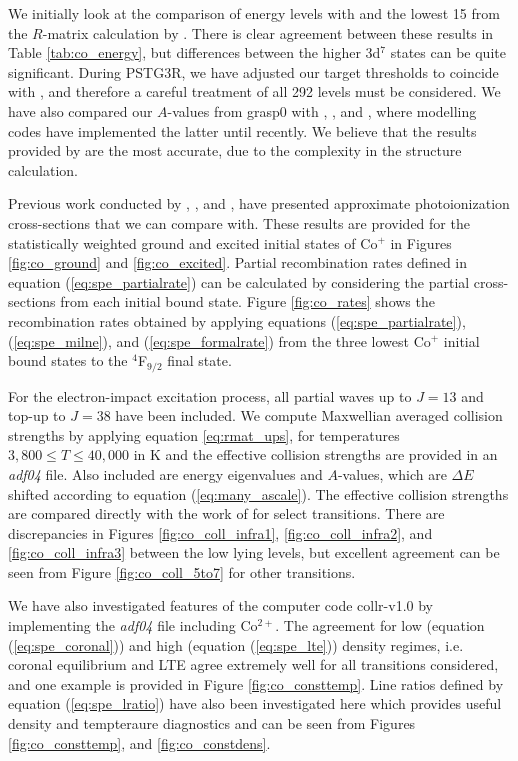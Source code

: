 We initially look at the comparison of energy levels with \citet{1985aeli.book.....S} and the lowest 15 from the $R$-matrix calculation by \citet{2016MNRAS.tmp..556S}. There is clear agreement between these results in Table \ref{tab:co_energy}, but differences between the higher 3d$^7$ states can be quite significant. During PSTG3R, we have adjusted our target thresholds to coincide with \citet{1985aeli.book.....S}, and therefore a careful treatment of all 292 levels must be considered. We have also compared our $A$-values from {\sc grasp0} with \citet{2016MNRAS.tmp..556S}, \citet{2016A&A...585A.121F}, and \citet{1984ApJ...277..435H}, where modelling codes have implemented the latter until recently. We believe that the results provided by \citet{2016A&A...585A.121F} are the most accurate, due to the complexity in the structure calculation.

Previous work conducted by \citet{1979ApJS...40..815R}, \citet{1993ADNDT..55..233V}, and \citet{2015JPhB...48n4014F}, have presented approximate photoionization cross-sections that we can compare with. These results are provided for the statistically weighted ground and excited initial states of Co$^+$ in Figures \ref{fig:co_ground} and \ref{fig:co_excited}. Partial recombination rates defined in equation (\ref{eq:spe_partialrate}) can be calculated by considering the partial cross-sections from each initial bound state. Figure \ref{fig:co_rates} shows the recombination rates obtained by applying equations (\ref{eq:spe_partialrate}), (\ref{eq:spe_milne}), and (\ref{eq:spe_formalrate}) from the three lowest Co$^+$ initial bound states to the $^4$F$_{9/2}$ final state.

For the electron-impact excitation process, all partial waves up to $J=13$ and top-up to $J=38$ have been included. We compute Maxwellian averaged collision strengths by applying equation \ref{eq:rmat_ups}, for temperatures $3,800 \leq T \leq 40,000$ in K and the effective collision strengths are provided in an \textit{adf04} file. Also included are energy eigenvalues and $A$-values, which are $\Delta E$ shifted according to equation (\ref{eq:many_ascale}). The effective collision strengths are compared directly with the work of \citet{2016MNRAS.tmp..556S} for select transitions. There are discrepancies in Figures \ref{fig:co_coll_infra1}, \ref{fig:co_coll_infra2}, and \ref{fig:co_coll_infra3} between the low lying levels, but excellent agreement can be seen from Figure \ref{fig:co_coll_5to7} for other transitions. 

We have also investigated features of the computer code {\sc collr-v1.0} by implementing the \textit{adf04} file including Co$^{2+}$. The agreement for low (equation (\ref{eq:spe_coronal})) and high (equation (\ref{eq:spe_lte})) density regimes, i.e. coronal equilibrium and LTE agree extremely well for all transitions considered, and one example is provided in Figure \ref{fig:co_consttemp}. Line ratios defined by equation (\ref{eq:spe_lratio}) have also been investigated here which provides useful density and tempteraure diagnostics and can be seen from Figures \ref{fig:co_consttemp}, and \ref{fig:co_constdens}.


